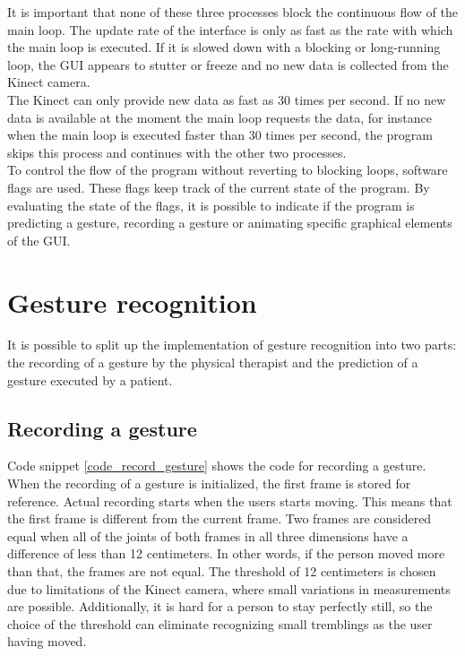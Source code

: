 It is important that none of these three processes block the continuous flow of the main loop. The update rate of the interface is only as fast as the rate with which the main loop is executed. If it is slowed down with a blocking or long-running loop, the GUI appears to stutter or freeze and no new data is collected from the Kinect camera.\\

The Kinect can only provide new data as fast as 30 times per second. If no new data is available at the moment the main loop requests the data, for instance when the main loop is executed faster than 30 times per second, the program skips this process and continues with the other two processes.\\

To control the flow of the program without reverting to blocking loops, software flags are used. These flags keep track of the current state of the program. By evaluating the state of the flags, it is possible to indicate if the program is predicting a gesture, recording a gesture or animating specific graphical elements of the GUI.


\section{Gesture recognition}

It is possible to split up the implementation of gesture recognition into two parts: the recording of a gesture by the physical therapist and the prediction of a gesture executed by a patient.


\subsection{Recording a gesture}

Code snippet \ref{code_record_gesture} shows the code for recording a gesture. When the recording of a gesture is initialized, the first frame is stored for reference. Actual recording starts when the users starts moving. This means that the first frame is different from the current frame. Two frames are considered equal when all of the joints of both frames in all three dimensions have a difference of less than 12 centimeters. In other words, if the person moved more than that, the frames are not equal. The threshold of 12 centimeters is chosen due to limitations of the Kinect camera, where small variations in measurements are possible. Additionally, it is hard for a person to stay perfectly still, so the choice of the threshold can eliminate recognizing small tremblings as the user having moved.\\

